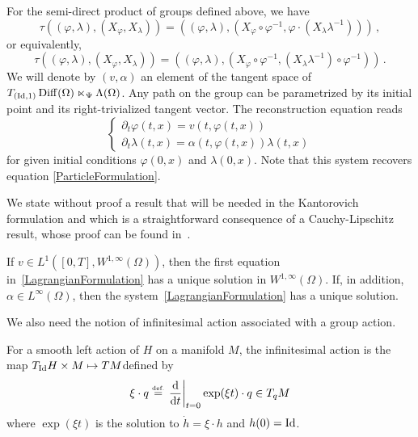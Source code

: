 \begin{example}
For the semi-direct product of groups defined above, we have 
\begin{equation}
\tau((\varphi,\lambda),(X_\varphi, X_\lambda)) = ((\varphi,\lambda),(X_\varphi \circ \varphi^{-1},\varphi \cdot (X_\lambda \lambda^{-1})))\,,
\end{equation}
or equivalently, 
\begin{equation}
\tau((\varphi,\lambda),(X_\varphi, X_\lambda)) = ((\varphi,\lambda),(X_\varphi \circ \varphi^{-1}, (X_\lambda \lambda^{-1}) \circ \varphi^{-1}))\,.
\end{equation}
We will denote by $(v,\alpha)$ an element of the tangent space of $T_{(\operatorname{Id},1)}\operatorname{Diff}(\Omega) \ltimes_\Psi \Lambda(\Omega)$.
Any path on the group can be parametrized by its initial point and its right-trivialized tangent vector. The reconstruction equation reads
\begin{equation}\label{LagrangianFormulation}
\begin{cases}
\partial_t \varphi(t,x)= v(t,\varphi(t,x))\\
\partial_t \lambda(t,x) = \alpha(t,\varphi(t,x)) \lambda(t,x)
\end{cases}
\end{equation}
for given initial conditions $\varphi(0,x)$ and $\lambda(0,x)$.
Note that this system recovers equation \eqref{ParticleFormulation}.
\end{example}

We state without proof a result that will be needed in the Kantorovich formulation and which is a straightforward consequence of a Cauchy-Lipschitz result, whose proof can be found in~\cite{ODE}.

\begin{proposition}\label{CauchyLipschitz}
If $v\in L^1([0,T],W^{1,\infty}(\Omega))$, then the first equation in~\eqref{LagrangianFormulation} has a unique solution in $W^{1,\infty}(\Omega)$.
%
If, in addition, $\alpha \in L^\infty(\Omega)$, then the system~\eqref{LagrangianFormulation} has a unique solution.
\end{proposition}


We also need the notion of infinitesimal action associated with a group action.

\begin{definition}
For a smooth left action of $H$ on a manifold $M$, the infinitesimal action is the map $T_{\operatorname{Id}} H \times M \mapsto TM $defined by
\begin{equation}
\xi \cdot q \stackrel{\mbox{\upshape\tiny def.}}{=} \left.\frac {\mathrm{d}}{\mathrm{d} t}\right|_{t=0} \exp (\xi t) \cdot q \in T_qM
\end{equation}
where $\exp(\xi t)$ is the solution to $\dot{h} = \xi \cdot h$ and $h(0) = \operatorname{Id}$.
\end{definition}

